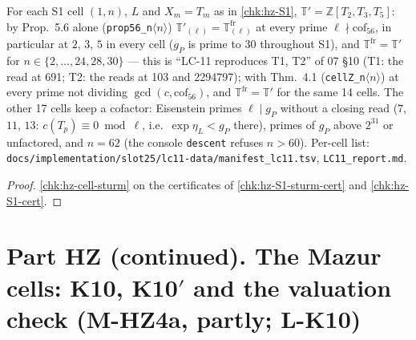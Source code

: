\begin{theorem}
  For each S1 cell $(1,n)$, $L$ and $X_m=T_m$ as in \ref{chk:hz-S1}, $\mathbb T'=\mathbb Z[T_2,T_3,T_5]$: by Prop.~5.6 alone
  (\texttt{prop56\_n$\langle n\rangle$}) $\mathbb T'_{(\ell)}=\mathbb T^{\mathrm{fr}}_{(\ell)}$ at every prime $\ell\nmid\mathrm{cof}_{56}$,
  in particular at $2$, $3$, $5$ in every cell ($g_P$ is prime to $30$ throughout S1), and $\mathbb T^{\mathrm{fr}}=\mathbb T'$ for
  $n\in\{2,\dots,24,28,30\}$ --- this is ``LC-11 reproduces T1, T2'' of 07 \S10 (T1: the read at 691; T2: the reads at 103 and 2294797);
  with Thm.~4.1 (\texttt{cellZ\_n$\langle n\rangle$}) at every prime not dividing $\gcd(c,\mathrm{cof}_{56})$, and
  $\mathbb T^{\mathrm{fr}}=\mathbb T'$ for the same 14 cells. The other 17 cells keep a cofactor: Eisenstein primes $\ell\mid g_P$ without a
  closing read ($7$, $11$, $13$: $c(T_p)\equiv0\bmod\ell$, i.e.\ $\exp\eta_L<g_P$ there), primes of $g_P$ above $2^{31}$ or unfactored, and
  $n=62$ (the console \texttt{descent} refuses $n>60$). Per-cell list: \texttt{docs/implementation/slot25/lc11-data/manifest\_lc11.tsv},
  \texttt{LC11\_report.md}.
\end{theorem}
\begin{proof}
  \leanok
  \ref{chk:hz-cell-sturm} on the certificates of \ref{chk:hz-S1-sturm-cert} and \ref{chk:hz-S1-cert}.
\end{proof}

\chapter{Part HZ (continued). The Mazur cells: K10, K10$'$ and the valuation check (M-HZ4a, partly; L-K10)}

